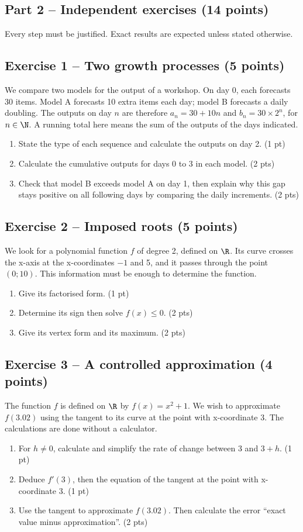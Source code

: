 \clearpage\subsection*{Part 2 -- Independent exercises (14 points)}
Every step must be justified. Exact results are expected unless stated otherwise.
\subsection*{Exercise 1 -- Two growth processes (5 points)}
We compare two models for the output of a workshop. On day 0, each forecasts 30 items. Model A forecasts 10 extra items each day; model B forecasts a daily doubling. The outputs on day $n$ are therefore $a_n=30+10n$ and $b_n=30\times2^n$, for $n\in\N$. A running total here means the sum of the outputs of the days indicated.
\begin{enumerate}
\item State the type of each sequence and calculate the outputs on day 2. \hfill(1 pt)
\item Calculate the cumulative outputs for days 0 to 3 in each model. \hfill(2 pts)
\item Check that model B exceeds model A on day 1, then explain why this gap stays positive on all following days by comparing the daily increments. \hfill(2 pts)
\end{enumerate}
\subsection*{Exercise 2 -- Imposed roots (5 points)}
We look for a polynomial function $f$ of degree 2, defined on $\R$. Its curve crosses the x-axis at the x-coordinates $-1$ and 5, and it passes through the point $(0;10)$. This information must be enough to determine the function.
\begin{enumerate}
\item Give its factorised form. \hfill(1 pt)
\item Determine its sign then solve $f(x)\leq0$. \hfill(2 pts)
\item Give its vertex form and its maximum. \hfill(2 pts)
\end{enumerate}
\subsection*{Exercise 3 -- A controlled approximation (4 points)}
The function $f$ is defined on $\R$ by $f(x)=x^2+1$. We wish to approximate $f(3.02)$ using the tangent to its curve at the point with x-coordinate 3. The calculations are done without a calculator.
\begin{enumerate}
\item For $h\ne0$, calculate and simplify the rate of change between 3 and $3+h$. \hfill(1 pt)
\item Deduce $f\prime(3)$, then the equation of the tangent at the point with x-coordinate 3. \hfill(1 pt)
\item Use the tangent to approximate $f(3.02)$. Then calculate the error ``exact value minus approximation''. \hfill(2 pts)
\end{enumerate}
